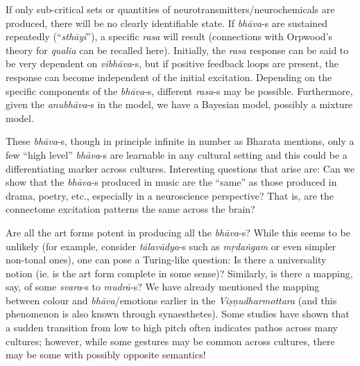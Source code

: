If only sub-critical sets or quantities of neurotransmitters/neuro\-chemicals are produced, there will be no clearly identifiable state. If \textsl{bhāva}-s are sustained repeatedly (“\textsl{sthāyi}”), a specific \textsl{rasa} will result (connections with Orpwood’s theory for \textsl{qualia} can be recalled here). Initially, the \textsl{rasa} response can be said to be very dependent on \textsl{vibhāva}-s, but if positive feedback loops are present, the response can become independent of the initial excitation. Depending on the specific components of the \textsl{bhāva}-s, different \textsl{rasa}-s may be possible. Furthermore, given the \textsl{anubhāva}-s in the model, we have a Bayesian model, possibly a mixture model.

These \textsl{bhāva}-s, though in principle infinite in number as Bharata mentions, only a few “high level” \textsl{bhāva}-s are learnable in any cultural setting and this could be a differentiating marker across cultures. Interesting questions that arise are: Can we show that the \textsl{bhāva}-s produced in music are the “same” as those produced in drama, poetry, etc., especially in a neuroscience perspective? That is, are the connectome excitation patterns the same across the brain?

Are all the art forms potent in producing all the \textsl{bhāva}-s? While this seems to be unlikely (for example, consider \textsl{tālavādya}-s such as \textsl{mṛdaṅgam} or even simpler non-tonal ones), one can pose a Turing-like question: Is there a universality notion (ie. is the art form complete in some sense)? Similarly, is there a mapping, say, of some \hbox{\textsl{svara}-s} to \textsl{mudrā}-s? We have already mentioned the mapping between colour and \textsl{bhāva}/emotions earlier in the \textsl{Viṣṇudharmottara} (and this phenomenon is also known through synaesthetes). Some studies have shown that a sudden transition from low to high pitch often indicates pathos across many cultures; however, while some gestures may be common across cultures, there may be some with possibly opposite semantics!

